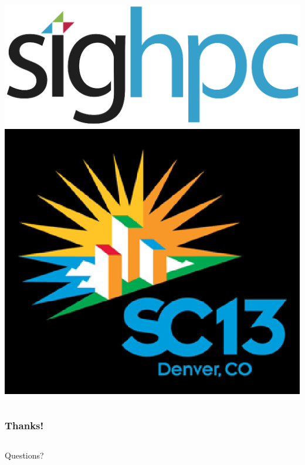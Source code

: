 \documentclass[red,slidestop,notes,compress,mathserif]{beamer}
\begin{document}
\begin{frame}
\begin{columns}
                \includegraphics[scale=0.25]{figs/sighpc.eps}
                \includegraphics[scale=0.26]{figs/SC13.eps}
\end{columns}
\end{frame}

\begin{frame}
\frametitle{Thanks!}
                \vfill%
\begin{columns}
        \begin{center}
        \begin{center}
                        {\LARGE Questions?}
        \end{center}
                \vfill%
        \end{center}
\end{columns}
                \vfill%
\end{frame}
\end{document}

